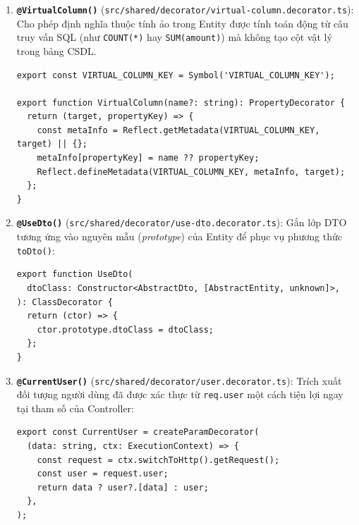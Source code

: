 \documentclass[12pt,a4paper,oneside]{book}
\begin{document}
\begin{enumerate}
  \item \textbf{\texttt{@VirtualColumn()}} (\texttt{src/shared/decorator/virtual-column.decorator.ts}): Cho phép định nghĩa thuộc tính ảo trong Entity được tính toán động từ câu truy vấn SQL (như \texttt{COUNT(*)} hay \texttt{SUM(amount)}) mà không tạo cột vật lý trong bảng CSDL.
\begin{codebox}
\begin{Verbatim}[fontsize=\small]
export const VIRTUAL_COLUMN_KEY = Symbol('VIRTUAL_COLUMN_KEY');

export function VirtualColumn(name?: string): PropertyDecorator {
  return (target, propertyKey) => {
    const metaInfo = Reflect.getMetadata(VIRTUAL_COLUMN_KEY, target) || {};
    metaInfo[propertyKey] = name ?? propertyKey;
    Reflect.defineMetadata(VIRTUAL_COLUMN_KEY, metaInfo, target);
  };
}
\end{Verbatim}
\end{codebox}

  \item \textbf{\texttt{@UseDto()}} (\texttt{src/shared/decorator/use-dto.decorator.ts}): Gắn lớp DTO tương ứng vào nguyên mẫu (\textit{prototype}) của Entity để phục vụ phương thức \texttt{toDto()}:
\begin{codebox}
\begin{Verbatim}[fontsize=\small]
export function UseDto(
  dtoClass: Constructor<AbstractDto, [AbstractEntity, unknown]>,
): ClassDecorator {
  return (ctor) => {
    ctor.prototype.dtoClass = dtoClass;
  };
}
\end{Verbatim}
\end{codebox}

  \item \textbf{\texttt{@CurrentUser()}} (\texttt{src/shared/decorator/user.decorator.ts}): Trích xuất đối tượng người dùng đã được xác thực từ \texttt{req.user} một cách tiện lợi ngay tại tham số của Controller:
\begin{codebox}
\begin{Verbatim}[fontsize=\small]
export const CurrentUser = createParamDecorator(
  (data: string, ctx: ExecutionContext) => {
    const request = ctx.switchToHttp().getRequest();
    const user = request.user;
    return data ? user?.[data] : user;
  },
);
\end{Verbatim}
\end{codebox}
\end{enumerate}
\end{document}
